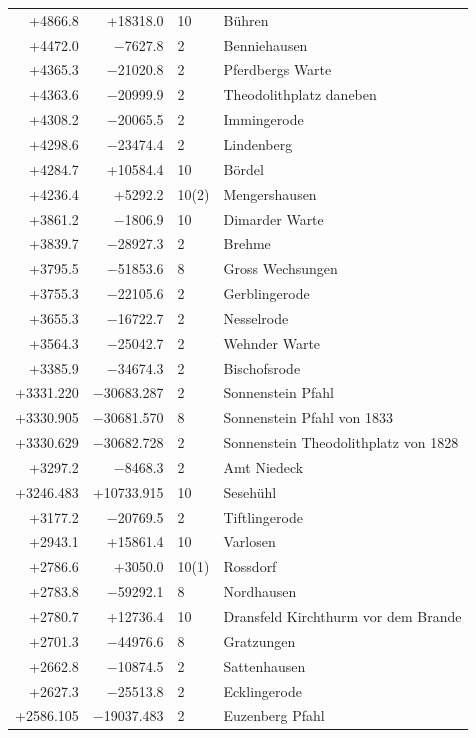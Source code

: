 \documentclass[12pt,a4paper]{article}
\begin{document}
\begin{longtable}{r r l p{6cm}}
+4866.8 & +18318.0 & 10 & B\"uhren \\
+4472.0 & $-$7627.8 & 2 & Benniehausen \\
+4365.3 & $-$21020.8 & 2 & Pferdbergs Warte \\
+4363.6 & $-$20999.9 & 2 & Theodolithplatz daneben \\
+4308.2 & $-$20065.5 & 2 & Immingerode \\
+4298.6 & $-$23474.4 & 2 & Lindenberg \\
+4284.7 & +10584.4 & 10 & B\"ordel \\
+4236.4 & +5292.2 & 10(2) & Mengershausen \\
+3861.2 & $-$1806.9 & 10 & Dimarder Warte \\
+3839.7 & $-$28927.3 & 2 & Brehme \\
+3795.5 & $-$51853.6 & 8 & Gross Wechsungen \\
+3755.3 & $-$22105.6 & 2 & Gerblingerode \\
+3655.3 & $-$16722.7 & 2 & Nesselrode \\
+3564.3 & $-$25042.7 & 2 & Wehnder Warte \\
+3385.9 & $-$34674.3 & 2 & Bischofsrode \\
+3331.220 & $-$30683.287 & 2 & Sonnenstein Pfahl \\
+3330.905 & $-$30681.570 & 8 & Sonnenstein Pfahl von 1833 \\
+3330.629 & $-$30682.728 & 2 & Sonnenstein Theodolithplatz von 1828 \\
+3297.2 & $-$8468.3 & 2 & Amt Niedeck \\
+3246.483 & +10733.915 & 10 & Seseh\"uhl \\
+3177.2 & $-$20769.5 & 2 & Tiftlingerode \\
+2943.1 & +15861.4 & 10 & Varlosen \\
+2786.6 & +3050.0 & 10(1) & Rossdorf \\
+2783.8 & $-$59292.1 & 8 & Nordhausen \\
+2780.7 & +12736.4 & 10 & Dransfeld Kirchthurm vor dem Brande \\
+2701.3 & $-$44976.6 & 8 & Gratzungen \\
+2662.8 & $-$10874.5 & 2 & Sattenhausen \\
+2627.3 & $-$25513.8 & 2 & Ecklingerode \\
+2586.105 & $-$19037.483 & 2 & Euzenberg Pfahl \\
\end{longtable}

\normalsize
\end{document}

